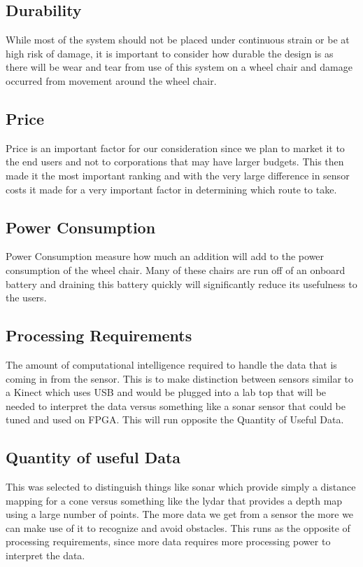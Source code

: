 \documentclass[oneside,final,a4paper]{report}
\begin{document}
\subsection{Durability}
While most of the system should not be placed under continuous strain or be at high risk of damage, it is important to consider how durable the design is as there will be wear and tear from use of this system on a wheel chair and damage occurred from movement around the wheel chair.

\subsection{Price}
Price is an important factor for our consideration since we plan to market it to the end users and not to corporations that may have larger budgets. This then made it the most important ranking and with the very large difference in sensor costs it made for a very important factor in determining which route to take.

\subsection{Power Consumption}
Power Consumption measure how much an addition will add to the power consumption of the wheel chair. Many of these chairs are run off of an onboard battery and draining this battery quickly will significantly reduce its usefulness to the users. 

\subsection{Processing Requirements}
The amount of computational intelligence required to handle the data that is coming in from the sensor. This is to make distinction between sensors similar to a Kinect which uses USB and would be plugged into a lab top that will be needed to interpret the data versus something like a sonar sensor that could be tuned and used on FPGA. This will run opposite the Quantity of Useful Data.

\subsection{Quantity of useful Data}
This was selected to distinguish things like sonar which provide simply a distance mapping for a cone versus something like the lydar that provides a depth map using a large number of points. The more data we get from a sensor the more we can make use of it to recognize and avoid obstacles. This runs as the opposite of processing requirements, since more data requires more processing power to interpret the data.
\end{document}
